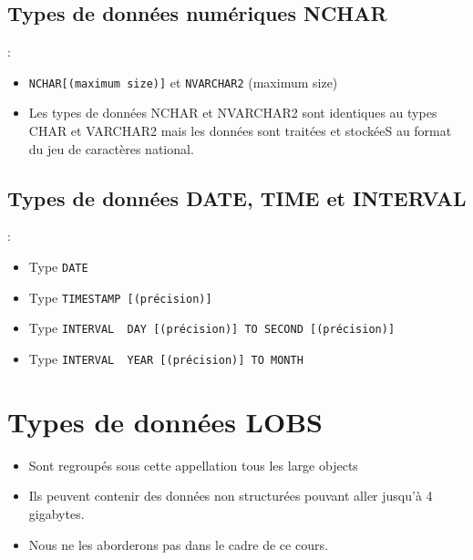 \documentclass[10pt]{beamer}
\begin{document}
\subsection{Types de données numériques NCHAR}
\begin{frame}{\secname : \subsecname}
    \begin{itemize}
        \item \lstinline[language=plsql]!NCHAR[(maximum size)]! et \lstinline[language=plsql]!NVARCHAR2! (maximum size)
        \item Les types de données NCHAR et NVARCHAR2 sont identiques au types CHAR et VARCHAR2 mais les données sont traitées et stockéeS au format du jeu de caractères national.
    \end{itemize}
\end{frame}

\subsection{Types de données DATE, TIME et INTERVAL}
\begin{frame}{\secname : \subsecname}
    \begin{itemize}
        \item Type \lstinline[language=plsql]!DATE!
        \item Type \lstinline[language=plsql]!TIMESTAMP [(précision)]!
        \item Type \lstinline[language=plsql]!INTERVAL  DAY [(précision)] TO SECOND [(précision)]!
        \item Type \lstinline[language=plsql]!INTERVAL  YEAR [(précision)] TO MONTH!
    \end{itemize}
\end{frame}

\section{Types de données LOBS}
\begin{frame}{\secname}
    \begin{itemize}
        \item Sont regroupés sous cette appellation tous les large objects
        \item Ils peuvent contenir des données non structurées pouvant aller jusqu'à 4 gigabytes.
        \item Nous ne les aborderons pas dans le cadre de ce cours.
    \end{itemize}
\end{frame}
\end{document}
